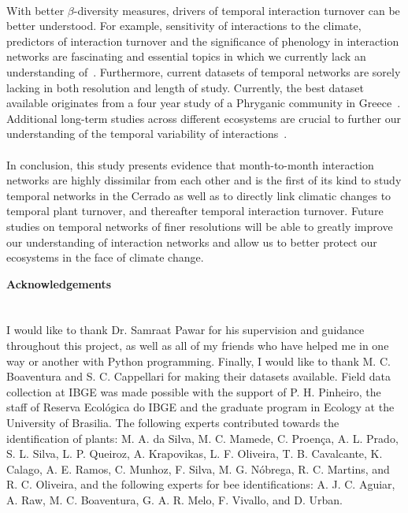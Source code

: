 \documentclass[11pt]{article}
\begin{document}
\\
With better $\beta$-diversity measures, drivers of temporal interaction turnover can be better understood. For example, sensitivity of interactions to the climate, predictors of interaction turnover and the significance of phenology in interaction networks are fascinating and essential topics in which we currently lack an understanding of~\citep{Poisot2012}. Furthermore, current datasets of temporal networks are sorely lacking in both resolution and length of study. Currently, the best dataset available originates from a four year study of a Phryganic community in Greece~\citep{Petanidou1991}. Additional long-term studies across different ecosystems are crucial to further our understanding of the temporal variability of interactions~\citep{Burkle2011}.\\
\\
In conclusion, this study presents evidence that month-to-month interaction networks are highly dissimilar from each other and is the first of its kind to study temporal networks in the Cerrado as well as to directly link climatic changes to temporal plant turnover, and thereafter temporal interaction turnover. Future studies on temporal networks of finer resolutions will be able to greatly improve our understanding of interaction networks and allow us to better protect our ecosystems in the face of climate change.

\newpage 
\vspace*{\fill}

{\huge\bfseries Acknowledgements} \label{sec: acknowledgements} \\
\\
\\
\large{I would like to thank Dr. Samraat Pawar for his supervision and guidance throughout this project, as well as  all of my friends who have helped me in one way or another with Python programming. Finally, I would like to thank M. C. Boaventura and S. C. Cappellari for making their datasets available. Field data collection at IBGE was made possible with the support of P. H. Pinheiro, the staff of Reserva Ecol\'{o}gica do IBGE and the graduate program in Ecology at the University of Brasilia. The following experts contributed towards the identification of plants: M. A. da Silva, M. C. Mamede, C. Proen\c{c}a, A. L. Prado, S. L. Silva, L. P. Queiroz, A. Krapovikas, L. F. Oliveira, T. B. Cavalcante, K. Calago, A. E. Ramos, C. Munhoz, F. Silva, M. G. N\'{o}brega, R. C. Martins, and R. C. Oliveira, and the following experts for bee identifications: A. J. C. Aguiar, A. Raw, M. C. Boaventura, G. A. R. Melo, F. Vivallo, and D. Urban.}
\vfill
\end{document}
